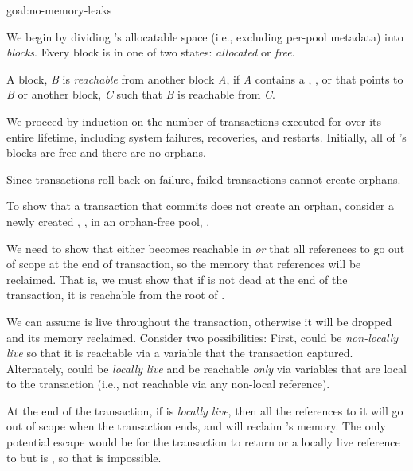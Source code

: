 \begin{goaltrue}{goal:no-memory-leaks}
  
We begin by dividing 's allocatable space (i.e., excluding per-pool
metadata) into \emph{blocks}.  Every block is in one of two states:
\emph{allocated} or \emph{free}.

A block, \emph{B} is \emph{reachable} from another block \emph{A}, if \emph{A}
contains a , , or  that points to \emph{B} or another
block, \emph{C} such that \emph{B} is reachable from \emph{C}.


We proceed by induction on the number of transactions executed for 
over its entire lifetime, including system failures, recoveries, and
restarts.  Initially, all of 's blocks are free and there are no orphans.

Since transactions roll back on failure, failed transactions cannot create
orphans.

To show that a \this{} transaction that commits does not create an orphan, consider a newly
created , , in an orphan-free pool, .

We need to show that either  becomes reachable
in  \emph{or} that all references to  go out of scope
at the end of transaction, so the memory that  references will be
reclaimed.  That is, we must show that if  is
not dead at the end of the transaction, it is reachable from the root
of .

We can assume  is live throughout the transaction, otherwise it will be
dropped and its memory reclaimed.  Consider two possibilities: First,  could be \emph{non-locally
live} so that it is reachable via a variable that the transaction captured.
Alternately,  could be \emph{locally live} and be reachable \emph{only}
via variables that are local to the transaction (i.e., not reachable via any
non-local reference).

At the end of the transaction, if  is \emph{locally live}, then all the
references to it will go out of scope when the transaction ends, and \this{}
will reclaim 's memory.  The only potential escape would be for the
transaction to return  or a locally live reference to  but  is , so that is impossible.


\end{goaltrue}
